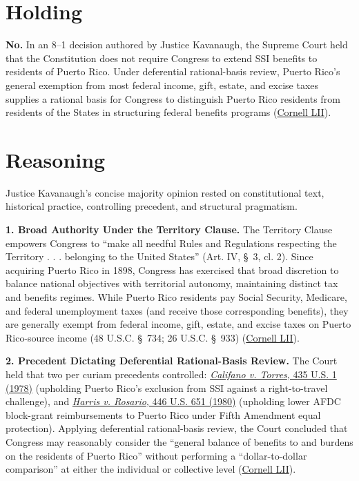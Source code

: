 \documentclass[12pt]{article}
\begin{document}
\section{Holding}
\textbf{No.} In an 8--1 decision authored by Justice Kavanaugh, the Supreme Court held that the Constitution does not require Congress to extend SSI benefits to residents of Puerto Rico. Under deferential rational-basis review, Puerto Rico's general exemption from most federal income, gift, estate, and excise taxes supplies a rational basis for Congress to distinguish Puerto Rico residents from residents of the States in structuring federal benefits programs (\href{https://www.law.cornell.edu/supremecourt/text/20-303}{Cornell LII}).

\section{Reasoning}
Justice Kavanaugh's concise majority opinion rested on constitutional text, historical practice, controlling precedent, and structural pragmatism.

\textbf{1. Broad Authority Under the Territory Clause.} The Territory Clause empowers Congress to ``make all needful Rules and Regulations respecting the Territory . . . belonging to the United States'' (Art. IV, \S~3, cl. 2). Since acquiring Puerto Rico in 1898, Congress has exercised that broad discretion to balance national objectives with territorial autonomy, maintaining distinct tax and benefits regimes. While Puerto Rico residents pay Social Security, Medicare, and federal unemployment taxes (and receive those corresponding benefits), they are generally exempt from federal income, gift, estate, and excise taxes on Puerto Rico-source income (48 U.S.C. \S~734; 26 U.S.C. \S~933) (\href{https://www.law.cornell.edu/supremecourt/text/20-303}{Cornell LII}).

\textbf{2. Precedent Dictating Deferential Rational-Basis Review.} The Court held that two per curiam precedents controlled: \href{https://supreme.justia.com/cases/federal/us/435/1/}{\emph{Califano v. Torres}, 435 U.S. 1 (1978)} (upholding Puerto Rico's exclusion from SSI against a right-to-travel challenge), and \href{https://supreme.justia.com/cases/federal/us/446/651/}{\emph{Harris v. Rosario}, 446 U.S. 651 (1980)} (upholding lower AFDC block-grant reimbursements to Puerto Rico under Fifth Amendment equal protection). Applying deferential rational-basis review, the Court concluded that Congress may reasonably consider the ``general balance of benefits to and burdens on the residents of Puerto Rico'' without performing a ``dollar-to-dollar comparison'' at either the individual or collective level (\href{https://www.law.cornell.edu/supremecourt/text/20-303}{Cornell LII}).
\end{document}
